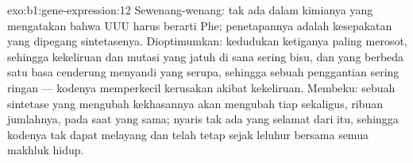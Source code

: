 \begin{solution}{exo:b1:gene-expression:12}
Sewenang-wenang: tak ada dalam kimianya yang mengatakan bahwa UUU harus
berarti Phe; penetapannya adalah kesepakatan yang dipegang
sintetasenya. Dioptimumkan: kedudukan ketiganya paling merosot,
sehingga kekeliruan dan mutasi yang jatuh di sana sering bisu, dan
 yang berbeda satu basa cenderung menyandi  yang serupa,
sehingga sebuah penggantian sering ringan --- kodenya memperkecil
kerusakan akibat kekeliruan. Membeku: sebuah sintetase yang mengubah
kekhasannya akan mengubah tiap   sekaligus, ribuan
jumlahnya, pada saat yang sama; nyaris tak ada  yang selamat dari
itu, sehingga kodenya tak dapat melayang dan telah tetap sejak leluhur
bersama semua makhluk hidup.
\end{solution}

